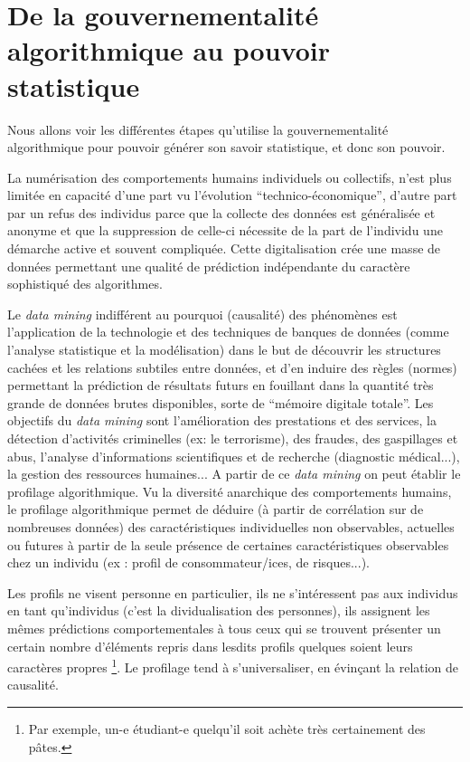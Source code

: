 \documentclass[a4paper,12pt]{report}
\begin{document}
\section{De la gouvernementalité algorithmique au pouvoir statistique}

Nous allons voir les différentes étapes qu'utilise la gouvernementalité algorithmique pour pouvoir générer son savoir statistique, et donc son pouvoir.

La numérisation des comportements humains individuels ou collectifs, n'est plus limitée en capacité d'une part vu l'évolution ``technico-économique'', d'autre part par un refus des individus parce que la collecte des données est généralisée et anonyme et que la suppression de celle-ci nécessite de la part de l'individu une démarche active et souvent compliquée.
Cette digitalisation crée une masse de données permettant une qualité de prédiction indépendante du caractère sophistiqué des algorithmes.

Le \textit{data mining} indifférent au pourquoi (causalité) des phénomènes est l'application de la technologie et des techniques de banques de données (comme l'analyse statistique et la modélisation) dans le but de découvrir les structures cachées et les relations subtiles entre données, et d'en induire des règles (normes) permettant la prédiction de résultats futurs en fouillant dans la quantité très grande de données brutes disponibles, sorte de ``mémoire digitale totale''. Les objectifs du \textit{data mining} sont l'amélioration des prestations et des services, la détection d'activités criminelles (ex: le terrorisme), des fraudes, des gaspillages et abus, l'analyse d'informations scientifiques et de recherche (diagnostic médical...), la gestion des ressources humaines...
A partir de ce \textit{data mining} on peut établir le profilage algorithmique. Vu la diversité anarchique des comportements humains, le profilage algorithmique permet de déduire (à partir de corrélation sur de nombreuses données) des caractéristiques individuelles non observables, actuelles ou futures à partir de la seule présence de certaines caractéristiques observables chez un individu (ex : profil de consommateur/ices, de risques...).

Les profils ne visent personne en particulier, ils ne s'intéressent pas aux individus en tant qu'individus (c'est la dividualisation des personnes), ils assignent les mêmes prédictions comportementales à tous ceux qui se trouvent présenter un certain nombre d'éléments repris dans lesdits profils quelques soient leurs caractères propres \footnote{Par exemple, un-e étudiant-e quelqu'il soit achète très certainement des pâtes.}. Le profilage tend à s'universaliser, en évinçant la relation de causalité.
\end{document}
